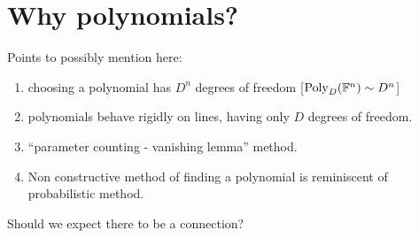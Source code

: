 \section{Why polynomials?}

Points to possibly mention here:
\begin{enumerate}
    \item choosing a polynomial has $D^n$ degrees of freedom [$\text{Poly}_D(\mathbb F^n) \sim D^n$]
    \item polynomials behave rigidly on lines, having only $D$ degrees of freedom.
    \item ``parameter counting - vanishing lemma'' method. 
    \item Non constructive method of finding a polynomial is reminiscent of probabilistic method.\cite{GOW2020}
\end{enumerate}

Should we expect there to be a connection?

